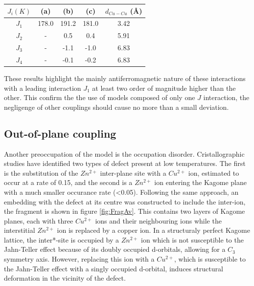 \documentclass[10pt]{report}
\numberwithin{equation}{section}
\begin{document}
\begin{center}\label{ResultatsDFT}
    \begin{tabular}{c c c c c}
        \hline
        $J_i (K)$ & (a) & (b) & (c) & $d_{Cu-Cu}$ (\AA{}) \\
        \hline
        $J_1$ & 178.0 & 191.2 & 181.0 &3.42\\
        $J_2$ & - & 0.5  & 0.4& 5.91\\
        $J_3$ & -& -1.1& -1.0&6.83\\
        $J_4$ & -& -0.1 & -0.2& 6.83\\
        \hline
    \end{tabular}
\end{center}

These results highlight the mainly antiferromagnetic nature of these interactions with a leading interaction $J_1$ at least two order of magnitude higher than the other.
This confirm the the use of models composed of only one $J$ interaction, the negligenge of other couplings should cause no more than a small deviation.

\subsection*{Out-of-plane coupling}

Another preoccupation of the model is the occupation disorder. Cristallographic studies have identified two types of defect present at low temperatures. 
The first is the substitution of the $Zn^{2+}$ inter-plane site with a $Cu^{2+}$ ion, estimated to occur at a rate of 0.15, and the second is a $Zn^{2+}$ ion entering the Kagome plane with a much smaller occurance rate (<0.05).
Following the same approach, an embedding with the defect at its centre was constructed to include the inter-ion, the fragment is shown in figure \ref{fig:FragAv}.
This contains two layers of Kagome planes, each with three $Cu^{2+}$ ions and their neighbouring ions while the interstitial $Zn^{2+}$ ion is replaced by a copper ion.
In a structuraly perfect Kagome lattice, the inter*-site is occupied by a $Zn^{2+}$ ion which is not susceptible to the Jahn-Teller effect because of its doubly occupied d-orbitals, allowing for a $C_3$ symmetry axis.
However, replacing this ion with a $Cu^{2+}$, which is susceptible to the Jahn-Teller effect with a singly occupied d-orbital, induces structural deformation in the vicinity of the defect.
\end{document}
